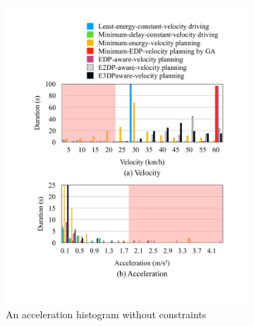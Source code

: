 \documentclass[onecolumn]{IEEEconf}
\begin{document}
\begin{description}
\begin{figure}[h!]
\begin{subfigure}{0.45\textwidth}
	\includegraphics[width=\hsize]{Figures/Histogram_noconst_acc.pdf}
	\caption{An acceleration histogram without constraints}
	\label{fig:histogram_noconst_acc}
	\end{subfigure}
	\begin{subfigure}{0.45\textwidth}

\end{subfigure}
\end{figure}
\end{description}
\end{document}
